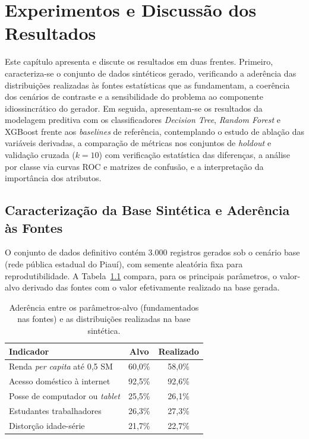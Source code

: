 \chapter{Experimentos e Discussão dos Resultados}

Este capítulo apresenta e discute os resultados em duas frentes. Primeiro, caracteriza-se o conjunto de dados sintéticos gerado, verificando a aderência das distribuições realizadas às fontes estatísticas que as fundamentam, a coerência dos cenários de contraste e a sensibilidade do problema ao componente idiossincrático do gerador. Em seguida, apresentam-se os resultados da modelagem preditiva com os classificadores \textit{Decision Tree}, \textit{Random Forest} e XGBoost frente aos \textit{baselines} de referência, contemplando o estudo de ablação das variáveis derivadas, a comparação de métricas nos conjuntos de \textit{holdout} e validação cruzada ($k=10$) com verificação estatística das diferenças, a análise por classe via curvas ROC e matrizes de confusão, e a interpretação da importância dos atributos.

\section{Caracterização da Base Sintética e Aderência às Fontes}

O conjunto de dados definitivo contém 3.000 registros gerados sob o cenário base (rede pública estadual do Piauí), com semente aleatória fixa para reprodutibilidade. A Tabela~\ref{tab:aderencia} compara, para os principais parâmetros, o valor-alvo derivado das fontes com o valor efetivamente realizado na base gerada.

\begin{table}[htb]
\centering
\caption{Aderência entre os parâmetros-alvo (fundamentados nas fontes) e as distribuições realizadas na base sintética.}
\label{tab:aderencia}
\begin{tabular}{p{6cm}cc}
\toprule
\textbf{Indicador} & \textbf{Alvo} & \textbf{Realizado} \\
\midrule
Renda \textit{per capita} até 0,5 SM & 60,0\% & 58,0\% \\
Acesso doméstico à internet & 92,5\% & 92,6\% \\
Posse de computador ou \textit{tablet} & 25,5\% & 26,1\% \\
Estudantes trabalhadores & 26,3\% & 27,3\% \\
Distorção idade-série & 21,7\% & 22,7\% \\
\bottomrule
\end{tabular}
\end{table}

